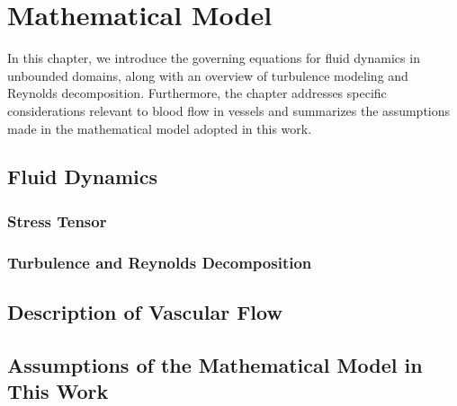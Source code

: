 \chapter{Mathematical Model}
In this chapter, we introduce the governing equations for fluid  dynamics in unbounded domains, along with an overview of turbulence modeling and Reynolds decomposition. Furthermore, the chapter addresses specific considerations relevant to blood flow in vessels and summarizes the assumptions made in the mathematical model adopted in this work.

\section{Fluid Dynamics}


\subsection{Stress Tensor}


\subsection{Turbulence and Reynolds Decomposition}\label{turb}


\section{Description of Vascular Flow}\label{cevni proudeni}


\section{Assumptions of the Mathematical Model in This Work}\label{pred}
